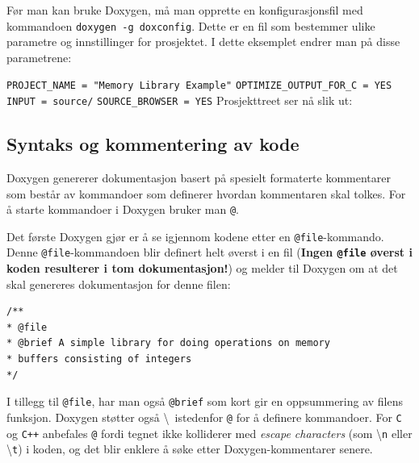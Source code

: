 \begin{alphasection}
Før man kan bruke Doxygen, må man opprette en konfigurasjonsfil med kommandoen \verb|doxygen -g doxconfig|. Dette er en fil som bestemmer ulike parametre og innstillinger for prosjektet. I dette eksemplet endrer man på disse parametrene:

\verb|PROJECT_NAME = "Memory Library Example"|\newline
\verb|OPTIMIZE_OUTPUT_FOR_C = YES|\newline
\verb|INPUT = source/|\newline
\verb|SOURCE_BROWSER = YES|
\newpage
Prosjekttreet ser nå slik ut:


\subsection{Syntaks og kommentering av kode}  

Doxygen genererer dokumentasjon basert på spesielt formaterte kommentarer som består av kommandoer som definerer hvordan kommentaren skal tolkes. For å starte kommandoer i Doxygen bruker man \verb|@|.

Det første Doxygen gjør er å se igjennom kodene etter en \verb|@file|-kommando. Denne \verb|@file|-kommandoen blir definert helt øverst i en fil (\textcolor{RWTHrot100}{\textbf{Ingen \texttt{@file} øverst i koden resulterer i tom dokumentasjon!}}) og melder til Doxygen om at det skal genereres dokumentasjon for denne filen:

\begin{lstlisting}
/**
* @file
* @brief A simple library for doing operations on memory
* buffers consisting of integers
*/
\end{lstlisting}






I tillegg til \verb|@file|, har man også \verb|@brief| som kort gir en oppsummering av filens funksjon. Doxygen støtter også \textbackslash \ istedenfor \verb|@| for å definere kommandoer. For \verb|C| og \verb|C++| anbefales \verb|@| fordi tegnet ikke kolliderer med \emph{escape characters} (som \textbackslash \verb|n| eller \textbackslash \verb|t|) i koden, og det blir enklere å søke etter Doxygen-kommentarer senere.




\end{alphasection}
